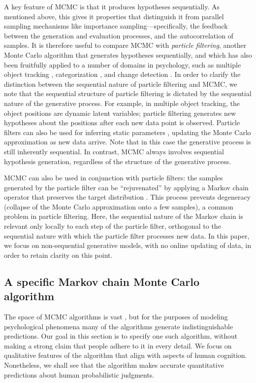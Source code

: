 A key feature of MCMC is that it produces hypotheses sequentially. As mentioned above, this gives it properties that distinguish it from parallel sampling mechanisms like importance sampling---specifically, the feedback between the generation and evaluation processes, and the autocorrelation of samples. It is therefore useful to 
compare MCMC with \emph{particle filtering}, another Monte Carlo algorithm that generates hypotheses sequentially, and which has also been fruitfully applied to a number of domains in psychology, such as multiple object tracking \citep{vul2009explaining}, categorization \citep{sanborn2010rational}, and change detection \citep{brown09}. In order to clarify the distinction between the sequential nature of particle filtering and MCMC, we note that the sequential structure of particle filtering is dictated by the sequential nature of the generative process. For example, in multiple object tracking, the object positions are dynamic latent variables; particle filtering generates new hypotheses about the positions after each new data point is observed. Particle filters can also be used for inferring static parameters \citep{chopin2002sequential}, updating the Monte Carlo approximation as new data arrive. Note that in this case the generative process is still inherently sequential. In contrast, MCMC always involves sequential hypothesis generation, regardless of the structure of the generative process.

MCMC can also be used in conjunction with particle filters: the samples generated by the particle filter can be ``rejuvenated'' by applying a Markov chain operator that preserves the target distribution \citep{Abbott2011ExploringLearning,thaker2017online}. This process prevents degeneracy (collapse of the Monte Carlo approximation onto a few samples), a common problem in particle filtering. Here, the sequential nature of the Markov chain is relevant only locally to each step of the particle filter, orthogonal to the sequential nature with which the particle filter processes new data. In this paper, we focus on non-sequential generative models, with no online updating of data, in order to retain clarity on this point.

\subsection{A specific Markov chain Monte Carlo algorithm}

The space of MCMC algorithms is vast \citep{robert13}, but for the purposes of modeling psychological phenomena many of the algorithms generate indistinguishable predictions. Our goal in this section is to specify one such algorithm, without making a strong claim that people adhere to it in every detail. We focus on qualitative features of the algorithm that align with aspects of human cognition. Nonetheless, we shall see that the algorithm makes accurate quantitative predictions about human probabilistic judgments.

